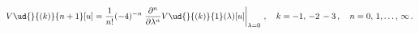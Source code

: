 \begin{equation*}
V\ud{}{(k)}{n+1}[u] = \frac{1}{{n}!}(-4)^{-{n}}
\left.\frac{\partial^{{n}}}{\partial\lambda^{{n}}}
V\ud{}{(k)}{1}(\lambda)[u]\right|_{\lambda = 0}\,,\quad {{k}} =
-1,\,-2\,-3 \,,\quad {{n}} = 0,\,1,\ldots,\,\infty\,.
\end{equation*}

